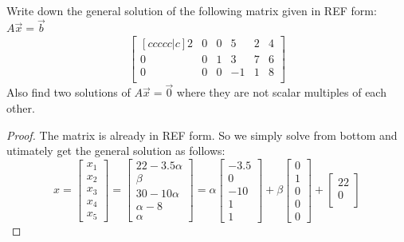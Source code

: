 \documentclass[11pt, a4paper]{article}
\begin{document}
\begin{Class Test}
    \item {} \\
    Write down the general solution of the following matrix given in REF form: $A\vec{x} = \vec{b}$
    $$\begin{bmatrix}[ccccc|c]
        2 & 0 & 0 & 5 & 2 & 4\\
        0 & 0 & 1 & 3 & 7 & 6\\
        0 & 0 & 0 & -1 & 1 & 8\\
    \end{bmatrix}$$
    Also find two solutions of $A\vec{x} = \vec{0}$ where they are not scalar multiples of each other.
    \begin{proof}
        The matrix is already in REF form. So we simply solve from bottom and utimately get the general solution as follows:
       $$ x= \begin{bmatrix}
            x_1\\
            x_2\\
            x_3\\
            x_4\\
            x_5
        \end{bmatrix}=
        \begin{bmatrix} 22-3.5\alpha\\
            \beta\\
            30-10\alpha\\
            \alpha-8\\
            \alpha
        \end{bmatrix}=
        \alpha \begin{bmatrix} 
            -3.5\\
            0\\
            -10\\
            1\\
            1
        \end{bmatrix}+
        \beta\begin{bmatrix} 
            0\\
            1\\
            0\\
            0\\
            0
        \end{bmatrix}+
        \begin{bmatrix} 
            22\\
            0\\

\end{bmatrix}$$
\end{proof}
\end{Class Test}
\end{document}
